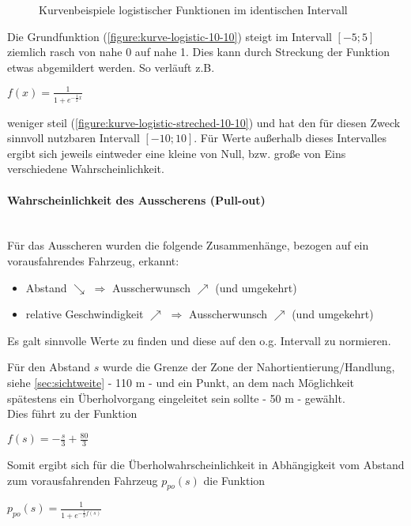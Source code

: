 \begin{figure}[hptb]
  \centering
     \qquad 
  \caption[Kurvenbeispiele der logistischen Funktion]
          {Kurvenbeispiele logistischer Funktionen im identischen Intervall}
  \label{figure:kurve-logistic}
\end{figure}

\noindent
Die Grundfunktion (\cref{figure:kurve-logistic-10-10}) steigt im Intervall $ [-5; 5] $ ziemlich rasch von nahe 0 auf nahe 1.
Dies kann durch Streckung der Funktion etwas abgemildert werden.
So verläuft z.B. 
\begin{center}
$ f(x) = \frac{1}{1 + e^{-\frac{1}{2}x}} $ 
\end{center}
weniger steil (\cref{figure:kurve-logistic-streched-10-10}) und hat den für diesen Zweck sinnvoll nutzbaren Intervall $ [-10; 10 ] $.
Für Werte außerhalb dieses Intervalles ergibt sich jeweils eintweder eine kleine von Null, bzw. große von Eins verschiedene Wahrscheinlichkeit.

\paragraph*{Wahrscheinlichkeit des Ausscherens (Pull-out)} 
\hfill \\
Für das Ausscheren wurden die folgende Zusammenhänge, bezogen auf ein vorausfahrendes Fahrzeug, erkannt:
\begin{itemize}
    \itemsep0em
    \item Abstand $ \searrow $  $ \Longrightarrow $ Ausscherwunsch $ \nearrow $ (und umgekehrt)
    \item relative Geschwindigkeit $ \nearrow $ $ \Longrightarrow $ Ausscherwunsch $ \nearrow $ (und umgekehrt)
\end{itemize}

Es galt sinnvolle Werte zu finden und diese auf den o.g. Intervall zu normieren.

Für den Abstand $ s $ wurde die Grenze der Zone der Nahortientierung/Handlung, siehe \cref{sec:sichtweite} - 110 m - und ein Punkt, an dem nach Möglichkeit spätestens ein Überholvorgang eingeleitet sein sollte - 50 m - gewählt.
\\
Dies führt zu der Funktion
\begin{center}
$ f(s) = -\frac{s}{3} + \frac{80}{3} $
\end{center}
Somit ergibt sich für die Überholwahrscheinlichkeit in Abhängigkeit vom Abstand zum vorausfahrenden Fahrzeug $ p_{po}(s) $ die Funktion
\begin{center}
$ p_{po}(s) = \frac{1}{1 + e^{-\frac{1}{2}f(s)}} $
\end{center}

